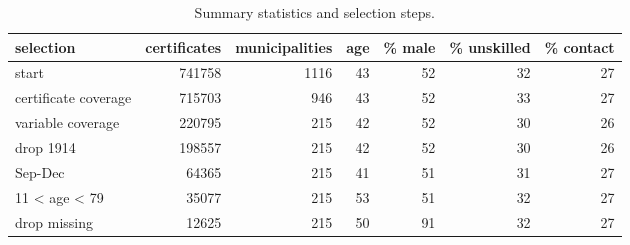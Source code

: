 \begin{table}

\caption{\label{tab:tab:sumselect}Summary statistics and selection steps.}
\centering
\begin{tabular}[t]{l|r|r|r|r|r|r}
\hline
selection & certificates & municipalities & age & \% male & \% unskilled & \% contact\\
\hline
start & 741758 & 1116 & 43 & 52 & 32 & 27\\
\hline
certificate coverage & 715703 & 946 & 43 & 52 & 33 & 27\\
\hline
variable coverage & 220795 & 215 & 42 & 52 & 30 & 26\\
\hline
drop 1914 & 198557 & 215 & 42 & 52 & 30 & 26\\
\hline
Sep-Dec & 64365 & 215 & 41 & 51 & 31 & 27\\
\hline
11 < age < 79 & 35077 & 215 & 53 & 51 & 32 & 27\\
\hline
drop missing & 12625 & 215 & 50 & 91 & 32 & 27\\
\hline
\end{tabular}
\end{table}
